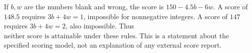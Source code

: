 If $b,w$ are the numbers blank and wrong, the score is $150-4.5b-6w$. A score of $148.5$ requires $3b+4w=1$, impossible for nonnegative integers. A score of $147$ requires $3b+4w=2$, also impossible. Thus $\boxed{\text{neither score is attainable under these rules}}$. This is a statement about the specified scoring model, not an explanation of any external score report.
